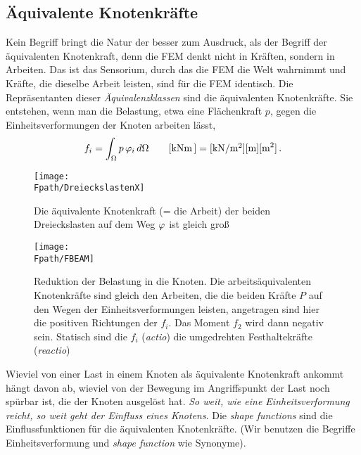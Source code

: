 {\textcolor{sectionTitleBlue}{\section{\"{A}quivalente Knotenkr\"{a}fte}}}
\label{Aequivalente Knotenkraefte}
Kein Begriff bringt die Natur der \FEM besser zum Ausdruck, als der Begriff der \"{a}quivalenten Knotenkraft, denn die FEM denkt nicht in Kr\"{a}ften, sondern in Arbeiten. Das ist das Sensorium, durch das die FEM die Welt wahrnimmt und Kr\"{a}fte, die dieselbe Arbeit leisten, sind f\"{u}r die FEM identisch. Die Repr\"{a}sentanten dieser {\em \"{A}quivalenzklassen} sind die \"{a}quivalenten Knotenkr\"{a}fte. Sie entstehen, wenn man die Belastung, etwa eine Fl\"{a}chenkraft $ p$, gegen die Einheitsverformungen der Knoten arbeiten l\"{a}sst,
\begin{align}\label{A311} f_i = \int_{\Omega}  p \, \varphi_i
 \,d\Omega \qquad  [\mbox{kNm}\,] = [\mbox{kN/m$^2$}] [\mbox{m}]
[\mbox{m}^2]\,.
\end{align}
\begin{figure}[tbp] \centering
\if {} \sidecaption \fi
\texttt{[image: \\Fpath/DreieckslastenX]}
\caption{Die \"{a}quivalente Knotenkraft (= die Arbeit) der beiden Dreieckslasten auf dem
Weg $\varphi$ ist gleich gro{\ss}} \label{Dreieckslasten}
\end{figure}%
\begin{figure}[tbp] \centering
\if {} \sidecaption \fi
\texttt{[image: \\Fpath/FBEAM]}
\caption{Reduktion der Belastung in die Knoten. Die arbeits\"{a}quivalenten Knotenkr\"{a}fte sind
gleich den Arbeiten, die die beiden Kr\"{a}fte $P$ auf den Wegen der Einheitsverformungen
leisten, angetragen sind hier die positiven Richtungen der $f_i$. Das Moment $f_2$ wird dann negativ sein. Statisch
sind die $f_i$ ({\em actio\/}) die umgedrehten Festhaltekr\"{a}fte ({\em reactio\/})} \label{FBeam}
\end{figure}%

Wieviel von einer Last in einem Knoten als \"{a}quivalente Knotenkraft \glq ankommt\grq\, h\"{a}ngt davon ab, wieviel von der Bewegung im Angriffspunkt der Last noch sp\"{u}rbar ist, die der Knoten ausgel\"{o}st hat. {\em So weit, wie eine Einheitsverformung reicht, so weit geht der Einfluss eines Knotens}. Die {\em shape functions\/} sind die  Einflussfunktionen f\"{u}r die \"{a}quivalenten Knotenkr\"{a}fte. (Wir benutzen die Begriffe Einheitsverformung und {\em shape function\/} wie Synonyme).

